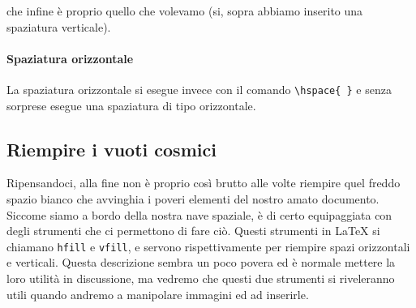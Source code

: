 \vspace{25px}

\noindent che infine è proprio quello che volevamo (si, sopra abbiamo inserito
una spaziatura verticale).

\paragraph*{Spaziatura orizzontale} La spaziatura orizzontale si esegue invece
con il comando \verb!\hspace{ }! e senza sorprese esegue una spaziatura di tipo
orizzontale.

\subsection{Riempire i vuoti cosmici}

Ripensandoci, alla fine non è proprio così brutto alle volte riempire quel
freddo spazio bianco che avvinghia i poveri elementi del nostro amato
documento. Siccome siamo a bordo della nostra nave spaziale, è di certo
equipaggiata con degli strumenti che ci permettono di fare ciò. Questi
strumenti in \LaTeX{} si chiamano \texttt{hfill} e \texttt{vfill}, e servono
rispettivamente per riempire spazi orizzontali e verticali. Questa descrizione
sembra un poco povera ed è normale mettere la loro utilità in discussione, ma
vedremo che questi due strumenti si riveleranno utili quando andremo a
manipolare immagini ed ad inserirle.

